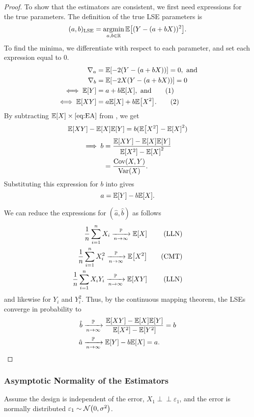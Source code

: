 \documentclass[letterpaper, reqno]{amsart}
\numberwithin{equation}{section}
\newcommand{\numberthis}{\addtocounter{equation}{1}\tag{\theequation}}
\newcommand{\E}[1]{\mathbb{E}\mleft[#1\mright]}
\newcommand{\Var}[1]{\operatorname{Var}\mleft(#1\mright)}
\newcommand{\Cov}[1]{\operatorname{Cov}\mleft(#1\mright)}
\newcommand{\R}{\mathbb{R}}  %
\newcommand{\N}[2]{\mathcal{N}\mleft( #1, #2 \mright)}
\newcommand{\indep}{\perp \!\!\! \perp}  %
\newcommand{\sumi}[2]{\sum_{#1=1}^{#2}}
\newcommand{\avg}[2]{\frac{1}{#2}\sumi{#1}{#2}}
\newcommand{\by}[1]{&\quad&\text{(#1)}}
\newcommand{\Plim}{\xrightarrow[n \to \infty]{\mathbb{P}}}
\newcommand{\ve}{\varepsilon}
\DeclareMathOperator*{\argmin}{argmin}
\begin{document}
\begin{proof}
  To show that the estimators are consistent, we first need expressions for the
  true parameters. The definition of the true LSE parameters is
  \[ (a, b)_\mathrm{LSE} = \argmin_{a, b \in \R} \E{(Y - (a + bX))^2}. \]
  To find the minima, we differentiate with respect to each parameter, and set
  each expression equal to 0.
  \begin{align*}
    \nabla_a &= \E{-2(Y - (a + bX))} = 0, \text{ and} \\
    \nabla_b &= \E{-2X(Y - (a + bX))} = 0 \\
    \iff \E{Y} &= a + b\E{X}, \text{ and} \numberthis \label{eq:EA} \\
    \iff \E{XY} &= a\E{X} + b\E{X^2}. \numberthis \label{eq:EB}
  \end{align*}
  By subtracting $\E{X} \times \text{\Cref{eq:EA}}$ from , we get
  \[ \E{XY} - \E{X}\E{Y} = b(\E{X^2} - \E{X}^2) \]
  \begin{align*}
    \implies b &= \frac{\E{XY} - \E{X}\E{Y}}{\E{X^2} - \E{X}^2} \\
               &= \frac{\Cov{X, Y}}{\Var{X}}.
  \end{align*}
  Substituting this expression for $b$ into  gives
  \[ a = \E{Y} - b\E{X}. \]

  We can reduce the expressions for $(\hat{a}, \hat{b})$ as follows
  \begin{alignat*}{3}
    \avg{i}{n}{X_i} \Plim \E{X} \by{LLN} \\
    \avg{i}{n}{X_i^2} \Plim \E{X^2} \by{CMT} \\
    \avg{i}{n}{X_iY_i} \Plim \E{XY} \by{LLN}
  \end{alignat*}
  and likewise for $Y_i$ and $Y_i^2$. Thus, by the continuous mapping theorem,
  the LSEs converge in probability to
  \begin{align*}
    \hat{b} &\Plim \frac{\E{XY} - \E{X}\E{Y}}{\E{X^2} - \E{Y^2}} = b \\
    \hat{a} &\Plim \E{Y} - b\E{X} = a. \qedhere
  \end{align*}
\end{proof}

\subsubsection{Asymptotic Normality of the Estimators}
Assume the design is independent of the error, $X_1 \indep \ve_1$, and the error
is normally distributed $\ve_1 \sim \N{0}{\sigma^2}$.
\end{document}
